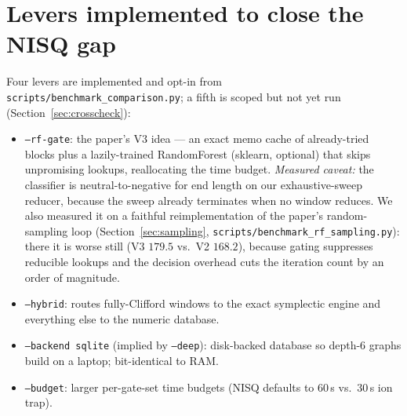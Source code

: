 \documentclass[11pt,a4paper]{article}
\begin{document}
\section{Levers implemented to close the NISQ gap}
\label{sec:levers}
Four levers are implemented and opt-in from
\texttt{scripts/benchmark\_comparison.py}; a fifth is scoped but not yet
run (Section~\ref{sec:crosscheck}):
\begin{itemize}
    \item \texttt{--rf-gate}: the paper's V3 idea --- an exact memo cache of
          already-tried blocks plus a lazily-trained RandomForest (sklearn,
          optional) that skips unpromising lookups, reallocating the time
          budget. \emph{Measured caveat:} the classifier is neutral-to-negative
          for end length on our exhaustive-sweep reducer, because the sweep
          already terminates when no window reduces. We also measured it on a
          faithful reimplementation of the paper's random-sampling loop
          (Section~\ref{sec:sampling}, \texttt{scripts/benchmark\_rf\_sampling.py}):
          there it is worse still (V3 $179.5$ vs.\ V2 $168.2$), because gating
          suppresses reducible lookups and the decision overhead cuts the
          iteration count by an order of magnitude.
    \item \texttt{--hybrid}: routes fully-Clifford windows to the exact
          symplectic engine and everything else to the numeric database.
    \item \texttt{--backend sqlite} (implied by \texttt{--deep}): disk-backed
          database so depth-6 graphs build on a laptop; bit-identical to RAM.
    \item \texttt{--budget}: larger per-gate-set time budgets (NISQ defaults to
          60\,s vs.\ 30\,s ion trap).
\end{itemize}
\end{document}
